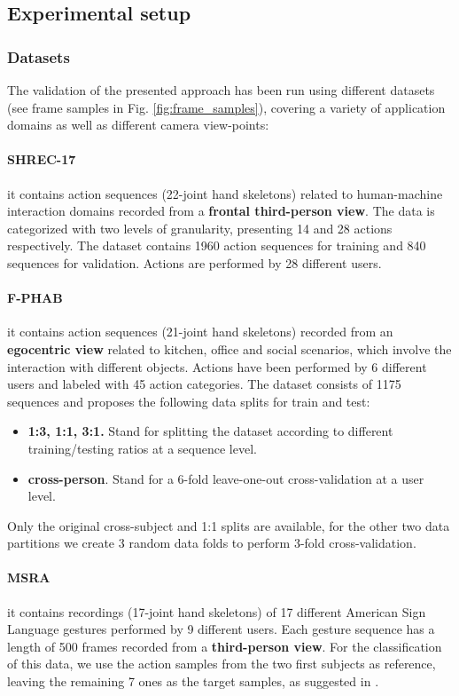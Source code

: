 \documentclass[letterpaper, 10 pt, conference]{ieeeconf}
\begin{document}
\subsection{Experimental setup}
\subsubsection{Datasets} The validation of the presented approach has been run using different datasets (see frame samples in Fig. \ref{fig:frame_samples}), covering a variety of application domains as well as different camera view-points: 


\paragraph*{SHREC-17 \cite{de2017shrec}} it contains action sequences (22-joint hand skeletons) related to human-machine interaction domains recorded from a \textbf{frontal third-person view}. The data is categorized with two levels of granularity, presenting 14 and 28 actions respectively. The dataset contains 1960 action sequences for training and 840 sequences for validation. 
Actions are performed by 28 different users.

\paragraph*{F-PHAB \cite{garcia2018first}} it contains action sequences (21-joint hand skeletons) recorded from an \textbf{egocentric view} related to kitchen, office and social scenarios, which involve the interaction with different objects. 
Actions have been performed by 6 different users and labeled with 45 action categories.
The dataset consists of 1175 sequences and proposes the following data splits for train and test:
\begin{itemize}
    \item \textbf{1:3, 1:1, 3:1.} Stand for splitting the dataset according to different training/testing ratios at a sequence level.
    \item \textbf{cross-person}. Stand for a 6-fold leave-one-out cross-validation at a user level.
\end{itemize}
Only the original cross-subject and 1:1 splits are available, for the other two data partitions we create 3 random data folds to perform 3-fold cross-validation.

\paragraph*{MSRA \cite{sun2015cascaded}} it contains recordings (17-joint hand skeletons) of 17 different American Sign Language gestures performed by 9 different users. Each gesture sequence has a length of 500 frames recorded from a \textbf{third-person view}.
For the classification of this data, we use the action samples from the two first subjects as reference, leaving the remaining 7 ones as the target samples, as suggested in \cite{liu20203d}. 
\end{document}
